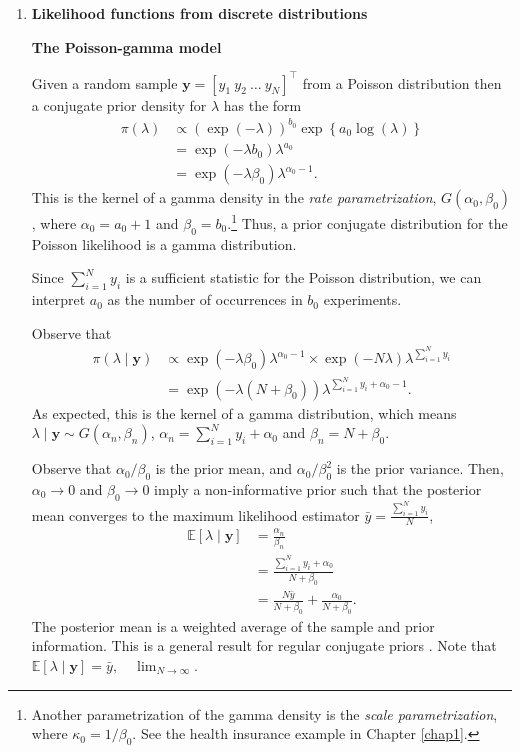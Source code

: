 \begin{enumerate}
	\item \textbf{Likelihood functions from discrete distributions}

\textbf{The Poisson-gamma model}

Given a random sample $\bm{y}=[y_1 \ y_2 \ \dots \ y_N]^{\top}$ from a Poisson distribution then a conjugate prior density for $\lambda$ has the form 
\begin{align}
	\pi(\lambda)&\propto \left(\exp(-\lambda)\right)^{b_0} \exp\left\{a_0\log(\lambda)\right\}\nonumber\\
	& = \exp(-\lambda b_0) \lambda^{a_0}\nonumber\\
	& = \exp(-\lambda \beta_0) \lambda^{\alpha_0-1}.\nonumber
\end{align}
This is the kernel of a gamma density in the \textit{rate parametrization}, \( G(\alpha_0, \beta_0) \), where \( \alpha_0 = a_0 + 1 \) and \( \beta_0 = b_0 \).\footnote{Another parametrization of the gamma density is the \textit{scale parametrization}, where \( \kappa_0 = 1/\beta_0 \). See the health insurance example in Chapter \ref{chap1}.} Thus, a prior conjugate distribution for the Poisson likelihood is a gamma distribution.

Since \( \sum_{i=1}^N y_i \) is a sufficient statistic for the Poisson distribution, we can interpret \( a_0 \) as the number of occurrences in \( b_0 \) experiments.

Observe that
\begin{align}
	\pi(\lambda\mid \bm{y})&\propto \exp(-\lambda \beta_0) \lambda^{\alpha_0-1} \times \exp(-N\lambda)\lambda^{\sum_{i=1}^Ny_i}\nonumber\\
	&= \exp(-\lambda(N+\beta_0)) \lambda^{\sum_{i=1}^Ny_i+\alpha_0-1}.\nonumber 
\end{align}
As expected, this is the kernel of a gamma distribution, which means $\lambda\mid \bm{y}\sim G(\alpha_n,\beta_n)$, $\alpha_n=\sum_{i=1}^Ny_i+\alpha_0$ and $\beta_n=N+\beta_0$.

Observe that $\alpha_0/\beta_0$ is the prior mean, and $\alpha_0/\beta_0^2$ is the prior variance. Then, $\alpha_0\rightarrow 0$ and $\beta_0\rightarrow 0$ imply a non-informative prior such that the posterior mean converges to the maximum likelihood estimator $\bar{y}=\frac{\sum_{i=1}^N y_i}{N}$,
\begin{align}
	\mathbb{E}\left[\lambda\mid \bm{y}\right]&=\frac{\alpha_n}{\beta_n}\nonumber\\
	&=\frac{\sum_{i=1}^Ny_i+\alpha_0}{N+\beta_0}\nonumber\\
	&=\frac{N\bar{y}}{N+\beta_0}+\frac{\alpha_0}{N+\beta_0}.\nonumber
\end{align}
The posterior mean is a weighted average of the sample and prior information. This is a general result for regular conjugate priors \cite{diaconis1979conjugate}. Note that \( \mathbb{E}[\lambda \mid \bm{y}] = \bar{y}, \quad \lim_{N \to \infty} \).


\end{enumerate}
